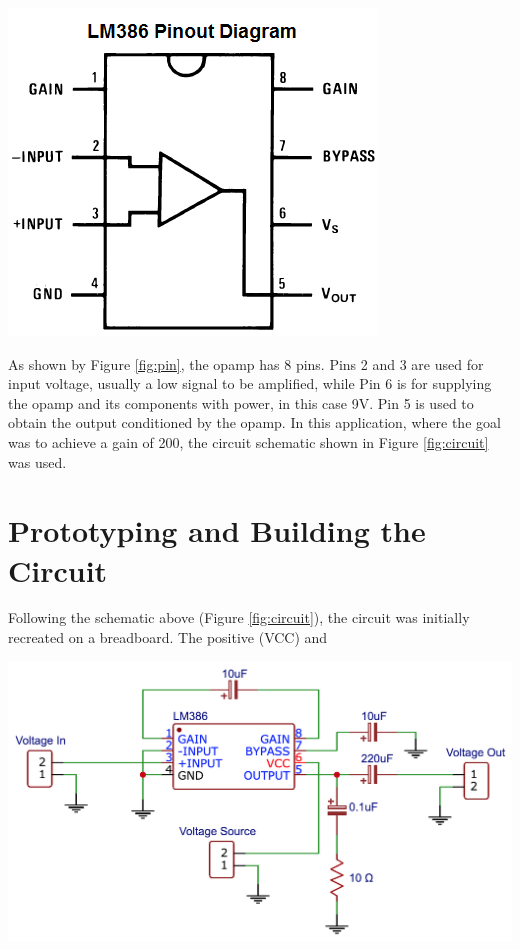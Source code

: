 \documentclass[journal]{IEEEtran}
\begin{document}
\begingroup
    \centering
    \medskip
    \includegraphics[scale=0.6]{images/lab6_1.png}
    \label{fig:pin}
    \medskip
\endgroup

\noindent As shown by Figure \ref{fig:pin}, the opamp has 8 pins. Pins 2 and 3 are used for input voltage, usually a low signal to be amplified, while Pin 6 is for supplying the opamp and its components with power, in this case 9V. Pin 5 is used to obtain the output conditioned by the opamp. In this application, where the goal was to achieve a gain of 200, the circuit schematic shown in Figure \ref{fig:circuit} was used. 

\section{Prototyping and Building the Circuit}

\noindent Following the schematic above (Figure \ref{fig:circuit}), the circuit was initially recreated on a breadboard. The positive (VCC) and

\begingroup
    \medskip
    \centering
    \includegraphics[width=\columnwidth]{images/lab6_2.png}
    \label{fig:circuit}
        \medskip
\endgroup
\end{document}
